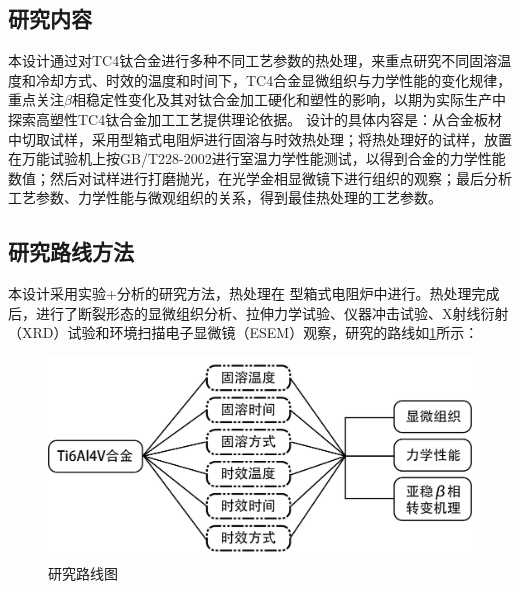 \subsection{研究内容}
本设计通过对TC4钛合金进行多种不同工艺参数的热处理，来重点研究不同固溶温度和冷却方式、时效的温度和时间下，TC4合金显微组织与力学性能的变化规律，重点关注$ \beta  $相稳定性变化及其对钛合金加工硬化和塑性的影响，以期为实际生产中探索高塑性TC4钛合金加工工艺提供理论依据。
设计的具体内容是：从\ti 合金板材中切取试样，采用型箱式电阻炉进行固溶与时效热处理；将热处理好的试样，放置在万能试验机上按{GB/T228-2002}进行室温力学性能测试，以得到合金的力学性能数值；然后对试样进行打磨抛光，在光学金相显微镜下进行组织的观察；最后分析工艺参数、力学性能与微观组织的关系，得到最佳热处理的工艺参数。
\subsection{研究路线方法}
本设计采用实验+分析的研究方法，热处理在%
型箱式电阻炉中进行。热处理完成后，进行了断裂形态的显微组织分析、拉伸力学试验、仪器冲击试验、X射线衍射（XRD）试验和环境扫描电子显微镜（ESEM）观察，研究的路线如\ref{fig:roadmap}所示：

\begin{figure}[h!]
	\centering
	\includegraphics[width=0.8\linewidth]{pic/路线图}
	\caption{研究路线图}
	\label{fig:roadmap}
\end{figure}
